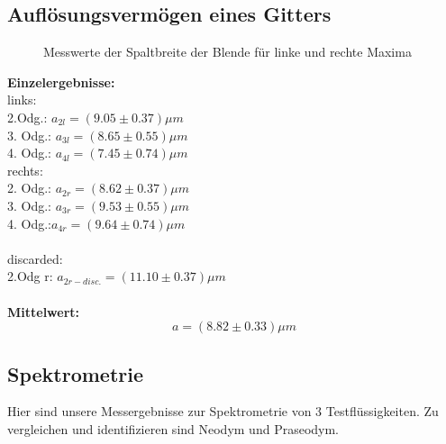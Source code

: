 \documentclass[12pt,a4paper]{article}
\begin{document}
\begin{multicols}{2}
\subsection{Auflösungsvermögen eines Gitters}


\begin{figure}[H]
	\centering
	\caption{Messwerte der Spaltbreite der Blende für linke und rechte Maxima}
	\label{tab:blendenbreite}
\end{figure}



\textbf{Einzelergebnisse:}\\
links:\\
2.Odg.: $a_{2l}=(9.05\pm 0.37) \mu m$\\
3. Odg.: $a_{3l}=(8.65 \pm 0.55) \mu m$\\
4. Odg.: $a_{4l}=(7.45\pm 0.74)\mu m$\\
rechts:\\
2. Odg.: $a_{2r}=(8.62\pm 0.37)\mu m$\\
3. Odg.: $a_{3r}=(9.53\pm 0.55) \mu m$\\
4. Odg.:$a_{4r}=(9.64 \pm 0.74) \mu m$\\
\\
discarded:\\
2.Odg r: $a_{2r-disc.}=(11.10 \pm 0.37)\mu m$\\
\\
\textbf{Mittelwert:}\\
$$a=(8.82 \pm 0.33)\mu m$$




\subsection{Spektrometrie}
Hier sind unsere Messergebnisse zur Spektrometrie von 3 Testflüssigkeiten. Zu vergleichen und identifizieren sind Neodym und Praseodym.

\end{multicols}
\end{document}
